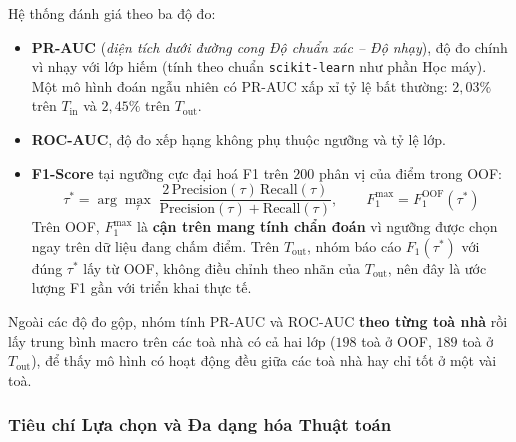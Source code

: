Hệ thống đánh giá theo ba độ đo:
\begin{itemize}
    \item \textbf{PR-AUC} (\textit{diện tích dưới đường cong Độ chuẩn xác -- Độ nhạy}), độ đo chính vì nhạy với lớp hiếm (tính theo chuẩn \texttt{scikit-learn} như phần Học máy). Một mô hình đoán ngẫu nhiên có PR-AUC xấp xỉ tỷ lệ bất thường: $2{,}03\%$ trên $T_{\text{in}}$ và $2{,}45\%$ trên $T_{\text{out}}$.
    \item \textbf{ROC-AUC}, độ đo xếp hạng không phụ thuộc ngưỡng và tỷ lệ lớp.
    \item \textbf{F1-Score} tại ngưỡng cực đại hoá F1 trên $200$ phân vị của điểm trong OOF:
    \begin{equation*}
        \tau^{*} = \arg\max_{\tau} \; \frac{2\,\text{Precision}(\tau)\,\text{Recall}(\tau)}{\text{Precision}(\tau) + \text{Recall}(\tau)}, \qquad F_1^{\max} = F_1^{\text{OOF}}(\tau^{*})
    \end{equation*}
    Trên OOF, $F_1^{\max}$ là \textbf{cận trên mang tính chẩn đoán} vì ngưỡng được chọn ngay trên dữ liệu đang chấm điểm. Trên $T_{\text{out}}$, nhóm báo cáo $F_1(\tau^{*})$ với đúng $\tau^{*}$ lấy từ OOF, không điều chỉnh theo nhãn của $T_{\text{out}}$, nên đây là ước lượng F1 gần với triển khai thực tế.
\end{itemize}
Ngoài các độ đo gộp, nhóm tính PR-AUC và ROC-AUC \textbf{theo từng toà nhà} rồi lấy trung bình macro trên các toà nhà có cả hai lớp ($198$ toà ở OOF, $189$ toà ở $T_{\text{out}}$), để thấy mô hình có hoạt động đều giữa các toà nhà hay chỉ tốt ở một vài toà.

\subsubsection{Tiêu chí Lựa chọn và Đa dạng hóa Thuật toán}

